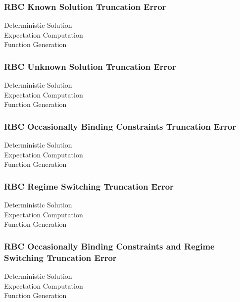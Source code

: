 \documentclass[tikz]{beamer}
\begin{document}
\begin{frame}
  \frametitle{RBC Known Solution Truncation Error }
  \begin{description}
  \item[Deterministic Solution] 
  \item[Expectation Computation] 
\item[Function Generation]
  \end{description}

\end{frame}


\begin{frame}
  \frametitle{RBC Unknown Solution Truncation Error }
  \begin{description}
  \item[Deterministic Solution] 
  \item[Expectation Computation] 
\item[Function Generation]
  \end{description}

\end{frame}


\begin{frame}
  \frametitle{RBC Occasionally Binding Constraints Truncation Error }
  \begin{description}
  \item[Deterministic Solution] 
  \item[Expectation Computation] 
\item[Function Generation]
  \end{description}

\end{frame}


\begin{frame}
  \frametitle{RBC Regime Switching Truncation Error }
  \begin{description}
  \item[Deterministic Solution] 
  \item[Expectation Computation] 
\item[Function Generation]
  \end{description}

\end{frame}



\begin{frame}
  \frametitle{RBC Occasionally Binding Constraints and Regime Switching  Truncation Error }
  \begin{description}
  \item[Deterministic Solution] 
  \item[Expectation Computation] 
\item[Function Generation]
  \end{description}

\end{frame}
\end{document}
